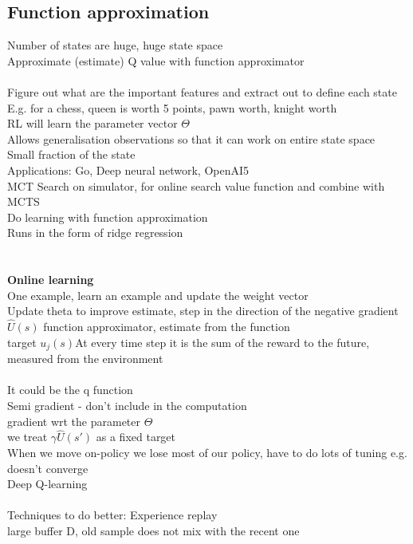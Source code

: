 \documentclass[11pt]{article}
\begin{document}
\subsection*{Function approximation}
Number of states are huge, huge state space\\
Approximate (estimate) Q value with function approximator\\
\\
Figure out what are the important features and extract out to define each state
E.g. for a chess, queen is worth 5 points, pawn worth, knight worth\\
RL will learn the parameter vector $\Theta$
\\
Allows generalisation observations so that it can work on entire state space\\
Small fraction of the state\\
Applications: Go, Deep neural network, OpenAI5
\\
MCT Search on simulator, for online search value function and combine with MCTS
\\
Do learning with function approximation\\
Runs in the form of ridge regression\\\\\\
\textbf{Online learning}\\
One example, learn an example and update the weight vector\\
Update theta to improve estimate, step in the direction of the negative gradient
\\
$\hat{U}(s)$ function approximator, estimate from the function\\
target $u_{j}(s)$At every time step it is the sum of the reward to the future, measured from the environment\\\\
It could be the q function\\
Semi gradient - don't include in the computation\\
gradient wrt the parameter $\Theta$\\
we treat $\gamma\hat{U}(s')$ as a fixed target
\\
When we move on-policy we lose most of our policy, have to do lots of tuning e.g. doesn't converge
\\
Deep Q-learning\\\\
Techniques to do better: Experience replay\\
large buffer D, old sample does not mix with the recent one\\\\
\end{document}
